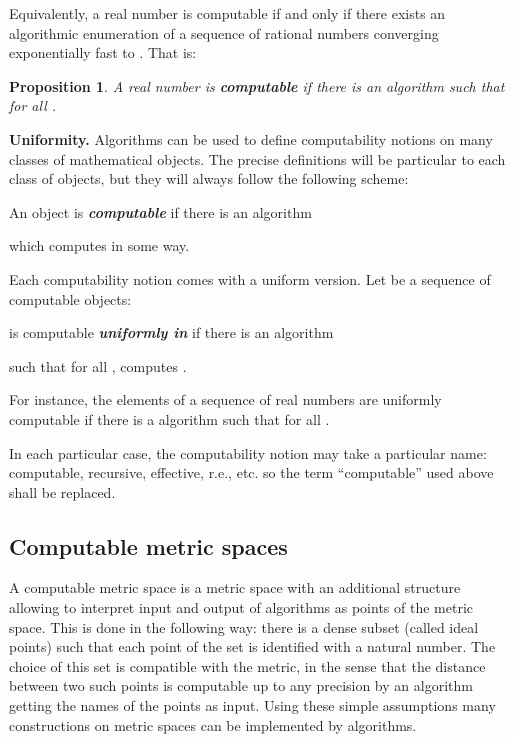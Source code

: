 \documentclass[copyright,creativecommons]{eptcs}
\newtheorem{proposition}{Proposition}
\numberwithin{equation}{section}
\begin{document}
Equivalently, a real number is computable if and only if there exists an
algorithmic enumeration of a sequence of rational numbers converging
exponentially fast to . That is:

\begin{proposition}
A real number is \textbf{\emph{computable}} if there is an algorithm  such that  for all .
\end{proposition}

\medskip

\noindent \textbf{Uniformity.} Algorithms can be used to define
computability notions on many classes of mathematical objects. The precise
definitions will be particular to each class of objects, but they will
always follow the following scheme:


\smallskip

\begin{center}
An object  is \textbf{\emph{computable}} if there is an algorithm


which computes  in some way.
\end{center}

\smallskip

Each computability notion comes with a uniform version. Let  be a sequence of computable objects:

\smallskip

\begin{center}
 is computable \textbf{\emph{uniformly in }} if there
is an algorithm


such that for all , 
computes .
\end{center}

\smallskip


For instance, the elements of a sequence of real numbers  are uniformly computable if there is a algorithm  such that 
for all .

In each particular case, the computability notion may take a particular
name: computable, recursive, effective, r.e., etc. so the term
``computable'' used above shall be replaced. 
\subsection{Computable metric spaces\label{CMS}}

A computable metric space is a metric space with an additional structure
allowing to interpret input and output of algorithms as points of the metric
space. This is done in the following way: there is a dense subset (called
ideal points) such that each point of the set is identified with a natural
number. The choice of this set is compatible with the metric, in the sense
that the distance between two such points is computable up to any precision
by an algorithm getting the names of the points as input. Using these simple
assumptions many constructions on metric spaces can be implemented by
algorithms.
\end{document}

